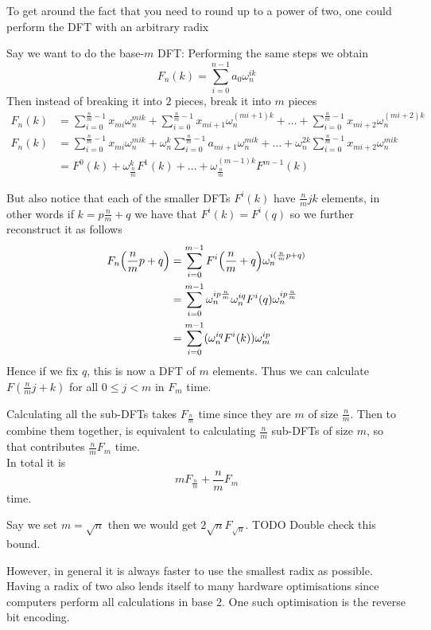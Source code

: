 To get around the fact that you need to round up to a power of two, one could perform the DFT with an arbitrary radix

Say we want to do the base-$m$ DFT:
Performing the same steps we obtain
\[
    F_n(k) = \sum^{n-1}_{i=0} a_0\omega_n^{ik}
\]
Then instead of breaking it into $2$ pieces, break it into $m$ pieces
\begin{align*}
    F_n(k) &= \sum^{\frac{n}{m}-1}_{i=0} x_{mi}\omega_n^{mik} + \sum^{\frac{n}{m}-1}_{i=0} x_{mi+1}\omega_n^{(mi+1)k} + \ldots + \sum^{\frac{n}{m}-1}_{i=0} x_{mi+2}\omega_n^{(mi+2)k}\\
    F_n(k) &= \sum^{\frac{n}{m}-1}_{i=0} x_{mi}\omega_n^{mik} + \omega_n^k\sum^{\frac{n}{m}-1}_{i=0} a_{mi+1}\omega_n^{mik} + \ldots +  \omega_n^{2k}\sum^{\frac{n}{m}-1}_{i=0} x_{mi+2}\omega_n^{mik}\\
    &= F^0(k) + \omega_{\frac{n}{m}}^k F^1(k) + \ldots + \omega_{\frac{n}{m}}^{(m-1)k} F^{m-1}(k)
\end{align*}

But also notice that each of the smaller DFTs $F^i(k)$ have $\frac{n}{m}jk$ elements, in other words if $k = p\frac{n}{m} + q$ we have that $F^i(k) = F^i(q)$ so we further reconstruct it as follows
\begin{align*}
    F_n\bb{\frac{n}{m}p + q} &= \sum^{m-1}_{i=0} F^i\bb{\frac{n}{m} + q}\omega^{i(\frac{n}{m}p + q)}_n\\
    &= \sum^{m-1}_{i=0} \omega^{ip\frac{n}{m}}_n \omega_n^{iq} F^i(q)\omega^{ip\frac{n}{m}}_n\\
    &= \sum^{m-1}_{i=0} (\omega^{iq}_n F^i(k))\omega^{ip}_m\\
\end{align*}
Hence if we fix $q$, this is now a DFT of $m$ elements. Thus we can calculate $F(\frac{n}{m}j + k)$ for all $0 \leq j < m$ in $F_m$ time.

Calculating all the sub-DFTs takes $F_{\frac{n}{m}}$ time since they are $m$ of size $\frac{n}{m}$. Then to combine them together, is equivalent to calculating $\frac{n}{m}$ sub-DFTs of size $m$, so that contributes $\frac{n}{m}F_{m}$ time.\\
In total it is
\[
    mF_{\frac{n}{m}} + \frac{n}{m}F_m
\]
time.

Say we set $m = \sqrt{n}$ then we would get $2\sqrt{n}F_{\sqrt{n}}$. TODO Double check this bound.

However, in general it is always faster to use the smallest radix as possible. Having a radix of two also lends itself to many hardware optimisations since computers perform all calculations in base 2. One such optimisation is the reverse bit encoding.

